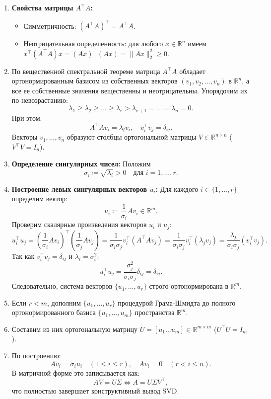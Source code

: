 \begin{enumerate}
    \item \textbf{Свойства матрицы $A^\top A$:}
    \begin{itemize}
        \item Симметричность: $(A^\top A)^\top = A^\top A$.
        \item Неотрицательная определенность: для любого $x \in \mathbb{R}^n$ имеем $x^\top (A^\top A) x =
        (Ax)^\top (Ax) = \|Ax\|_2^2 \ge 0$.
    \end{itemize}
    \item По вещественной спектральной теореме матрица $A^\top A$ обладает ортонормированным базисом из
    собственных векторов $(v_1, v_2, \dots, v_n)$ в $\mathbb{R}^n$, а все ее собственные значения вещественны и
    неотрицательны.
    Упорядочим их по невозрастанию:
    \[ \lambda_1 \ge \lambda_2 \ge \dots \ge \lambda_r > \lambda_{r+1} = \dots = \lambda_n = 0. \]
    При этом:
    \[ A^\top A v_i = \lambda_i v_i, \quad v_i^\top v_j = \delta_{ij}. \]
    Векторы $v_1, \dots, v_n$ образуют столбцы ортогональной матрицы $V \in \mathbb{R}^{n \times n}$ (
    $V^\top V = I_n$).
    \item \textbf{Определение сингулярных чисел:} Положим
    \[ \sigma_i \coloneqq \sqrt{\lambda_i} > 0 \quad \text{для } i = 1, \dots, r. \]
    \item \textbf{Построение левых сингулярных векторов $u_i$:} Для каждого $i \in \{1,\dots, r\}$ определим вектор:
    \[ u_i \coloneqq \frac{1}{\sigma_i} A v_i \in \mathbb{R}^m. \]
    Проверим скалярные произведения векторов $u_i$ и $u_j$:
    \[ u_i^\top u_j = \left(\frac{1}{\sigma_i} A v_i\right)^\top \left(\frac{1}{\sigma_j} A v_j\right) =
    \frac{1}{\sigma_i \sigma_j} v_i^\top (A^\top A v_j) = \frac{1}{\sigma_i \sigma_j} v_i^\top (\lambda_j v_j) =
    \frac{\lambda_j}{\sigma_i \sigma_j} (v_i^\top v_j). \]
    Так как $v_i^\top v_j = \delta_{ij}$ и $\lambda_i = \sigma_i^2$:
    \[ u_i^\top u_j = \frac{\sigma_j^2}{\sigma_i \sigma_j} \delta_{ij} = \delta_{ij}. \]
    Следовательно, система векторов $\{u_1, \dots, u_r\}$ строго ортонормирована в $\mathbb{R}^m$.
    \item Если $r < m$, дополним $\{u_1, \dots, u_r\}$ процедурой Грама-Шмидта до полного ортонормированного базиса
    $\{u_1, \dots, u_m\}$ пространства $\mathbb{R}^m$.
    \item Составим из них ортогональную матрицу $U = [u_1 \dots u_m]
    \in \mathbb{R}^{m \times m}$ ($U^\top U = I_m$).
    \item По построению:
    \[ A v_i = \sigma_i u_i \quad (1 \le i \le r), \quad A v_i = 0 \quad (r < i \le n). \]
    В матричной форме это записывается как:
    \[ A V = U \Sigma \iff A = U \Sigma V^\top, \] что полностью завершает конструктивный вывод SVD\@.
\end{enumerate}

